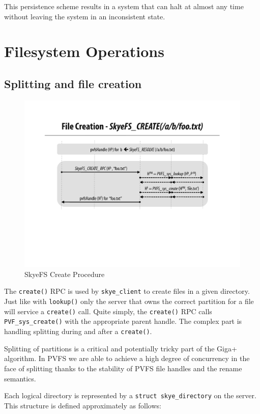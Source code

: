\documentclass[letterpaper]{article}
\newcommand{\code}[1]{\texttt{#1}}
\begin{document}
This persistence scheme results in a system that can halt at almost any time
without leaving the system in an inconsistent state.

\section{Filesystem Operations}
\subsection{Splitting and file creation}
\begin{figure}
\begin{center}
\includegraphics[scale=0.4]{figure-create}
\end{center}
\caption{SkyeFS Create Procedure}
\end{figure}
The \code{create()} RPC is used by \code{skye\_\-client} to create files in a given
directory.  Just like with \code{lookup()} only the server that owns the correct
partition for a file will service a \code{create()} call.  Quite simply, the
\code{create()} RPC calls \code{PVF\_\-sys\_\-create()} with the appropriate
parent handle.  The complex part is handling splitting during and after a
\code{create()}.

Splitting of partitions is a critical and potentially tricky part of the Giga+
algorithm.  In PVFS we are able to achieve a high degree of concurrency in the
face of splitting thanks to the stability of PVFS file handles and the rename
semantics.

Each logical directory is represented by a \code{struct skye\_\-directory} on
the server.  This structure is defined approximately as follows:
\end{document}
